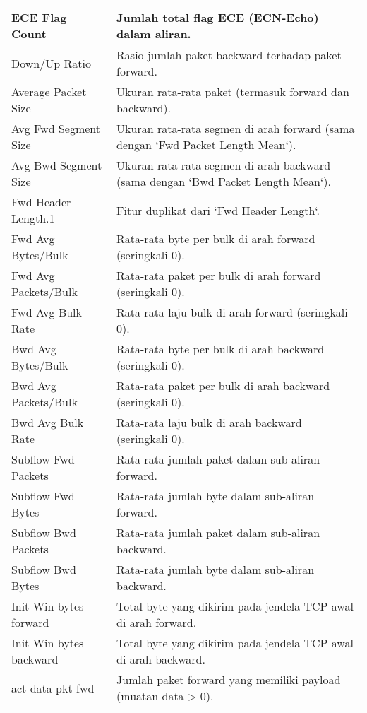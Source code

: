 \documentclass[a4paper,12pt]{report}
\begin{document}
\begin{table}[h!]
	\centering
	\begin{longtable}{|p{3cm} | p{10cm} |}
		\hline
		ECE Flag Count & Jumlah total flag ECE (ECN-Echo) dalam aliran. \\
		\hline
		Down/Up Ratio & Rasio jumlah paket backward terhadap paket forward. \\
		\hline
		Average Packet Size & Ukuran rata-rata paket (termasuk forward dan backward). \\
		\hline
		Avg Fwd Segment Size & Ukuran rata-rata segmen di arah forward (sama dengan `Fwd Packet Length Mean`). \\
		\hline
		Avg Bwd Segment Size & Ukuran rata-rata segmen di arah backward (sama dengan `Bwd Packet Length Mean`). \\
		\hline
		Fwd Header Length.1 & Fitur duplikat dari `Fwd Header Length`. \\
		\hline
		Fwd Avg Bytes/Bulk & Rata-rata byte per bulk di arah forward (seringkali 0). \\
		\hline
		Fwd Avg Packets/Bulk & Rata-rata paket per bulk di arah forward (seringkali 0). \\
		\hline
		Fwd Avg Bulk Rate & Rata-rata laju bulk di arah forward (seringkali 0). \\
		\hline
		Bwd Avg Bytes/Bulk & Rata-rata byte per bulk di arah backward (seringkali 0). \\
		\hline
		Bwd Avg Packets/Bulk & Rata-rata paket per bulk di arah backward (seringkali 0). \\
		\hline
		Bwd Avg Bulk Rate & Rata-rata laju bulk di arah backward (seringkali 0). \\
		\hline
		Subflow Fwd Packets & Rata-rata jumlah paket dalam sub-aliran forward. \\
		\hline
		Subflow Fwd Bytes & Rata-rata jumlah byte dalam sub-aliran forward. \\
		\hline
		Subflow Bwd Packets & Rata-rata jumlah paket dalam sub-aliran backward. \\
		\hline
		Subflow Bwd Bytes & Rata-rata jumlah byte dalam sub-aliran backward. \\
		\hline
		Init Win bytes forward & Total byte yang dikirim pada jendela TCP awal di arah forward. \\
		\hline
		Init Win bytes backward & Total byte yang dikirim pada jendela TCP awal di arah backward. \\
		\hline
		act data pkt fwd & Jumlah paket forward yang memiliki payload (muatan data > 0). \\

\end{longtable}
\end{table}
\end{document}
